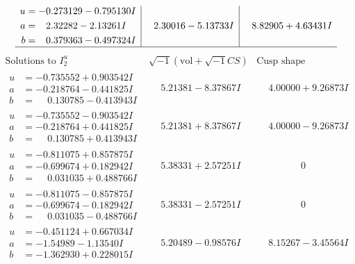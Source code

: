 \documentclass[1p]{elsarticle_modified}
\theoremstyle{definition}
\newcommand{\I}{\sqrt{-1}}
\begin{document}
$$\begin{array}{c|c|c}
\begin{aligned}
u &= -0.273129 - 0.795130 I \\
a &= \phantom{-}2.32282 - 2.13261 I \\
b &= \phantom{-}0.379363 - 0.497324 I\end{aligned}
 & \phantom{-}2.30016 - 5.13733 I & \phantom{-}8.82905 + 4.63431 I\\
 \hline 
 \end{array}$$\newpage$$\begin{array}{c|c|c}  
\text{Solutions to }I^u_{2}& \I (\text{vol} + \sqrt{-1}CS) & \text{Cusp shape}\\
 \hline 
\begin{aligned}
u &= -0.735552 + 0.903542 I \\
a &= -0.218764 - 0.441825 I \\
b &= \phantom{-}0.130785 - 0.413943 I\end{aligned}
 & \phantom{-}5.21381 - 8.37867 I & \phantom{-}4.00000 + 9.26873 I \\ \hline\begin{aligned}
u &= -0.735552 - 0.903542 I \\
a &= -0.218764 + 0.441825 I \\
b &= \phantom{-}0.130785 + 0.413943 I\end{aligned}
 & \phantom{-}5.21381 + 8.37867 I & \phantom{-}4.00000 - 9.26873 I \\ \hline\begin{aligned}
u &= -0.811075 + 0.857875 I \\
a &= -0.699674 + 0.182942 I \\
b &= \phantom{-}0.031035 + 0.488766 I\end{aligned}
 & \phantom{-}5.38331 + 2.57251 I & \phantom{-0.000000 } 0 \\ \hline\begin{aligned}
u &= -0.811075 - 0.857875 I \\
a &= -0.699674 - 0.182942 I \\
b &= \phantom{-}0.031035 - 0.488766 I\end{aligned}
 & \phantom{-}5.38331 - 2.57251 I & \phantom{-0.000000 } 0 \\ \hline\begin{aligned}
u &= -0.451124 + 0.667034 I \\
a &= -1.54989 - 1.13540 I \\
b &= -1.362930 + 0.228015 I\end{aligned}
 & \phantom{-}5.20489 - 0.98576 I & \phantom{-}8.15267 - 3.45564 I \\ \hline\begin{aligned}

\end{aligned}
\end{array}$$
\end{document}
